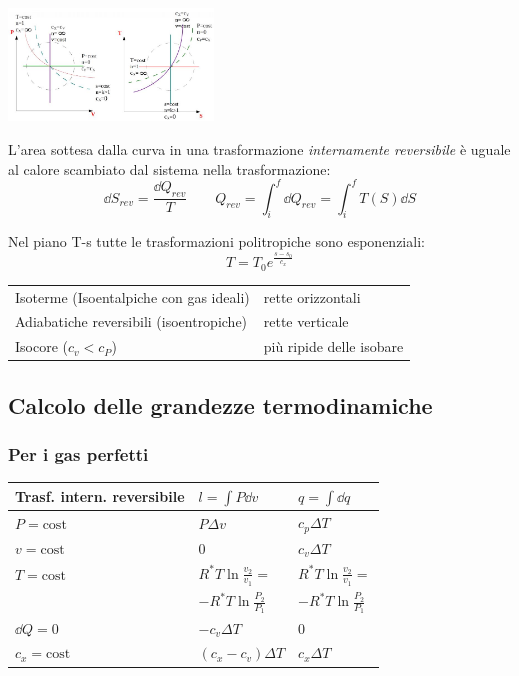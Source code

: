 \begin{center}
    \includegraphics[height=3cm]{politropiche2.JPG}
\end{center}

L'area sottesa dalla curva in una trasformazione \emph{internamente reversibile} è uguale al calore scambiato dal sistema nella trasformazione:
\[ \dd{S}_{rev} = \frac{\dd{Q}_{rev}}{T} \qquad Q_{rev} = \int_i^f \dd{Q}_{rev} = \int_i^f T(S) \dd{S} \]

Nel piano T-s tutte le trasformazioni politropiche sono esponenziali:
\[T = T_0 e ^ { \frac{s-s_0}{c_x} }\]

\begin{tabular}{ll}
    Isoterme  (Isoentalpiche con gas ideali) & rette orizzontali \\
    Adiabatiche reversibili (isoentropiche) & rette verticale \\
    Isocore ($c_v < c_P$) & più ripide delle isobare \\
\end{tabular}

\subsection{Calcolo delle grandezze termodinamiche}
\subsubsection{Per i gas perfetti}
\begin{tabular}{lll}
    \toprule
    Trasf. intern. reversibile & $l=\int P\dd{v}$ & $q = \int \dd{q}$ \\
    \midrule
    $P = \text{cost}$ & $P\Delta v$ & $c_p\Delta T$ \\
    $v = \text{cost}$ & 0 & $c_v\Delta T$ \\
    $T = \text{cost}$ & $R^*T\ln{\frac{v_2}{v_1}} =$ & $R^*T\ln{\frac{v_2}{v_1}} =$ \\
    & $-R^*T\ln{\frac{P_2}{P_1}}$ & $-R^*T\ln{\frac{P_2}{P_1}}$ \\
    $\dd{Q}=0$ & $-c_v\Delta T$ & 0 \\
    $c_x = \text{cost}$ & $(c_x-c_v)\Delta T$ & $c_x\Delta T$ \\
    \bottomrule
\end{tabular}

